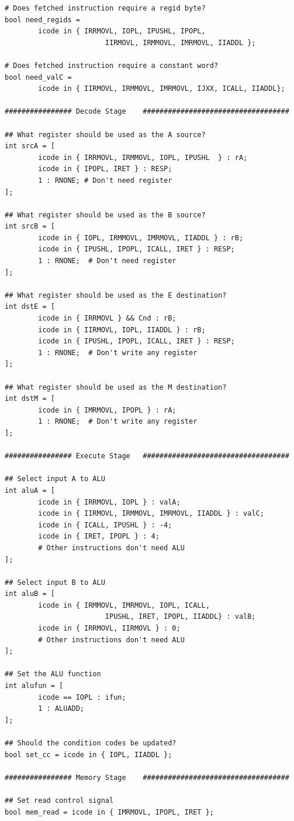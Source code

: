 \documentclass{article}
\begin{document}
\begin{lstlisting}[caption={seq-full.hcl}, label={cd:seq}]
# Does fetched instruction require a regid byte?
bool need_regids =
        icode in { IRRMOVL, IOPL, IPUSHL, IPOPL, 
                        IIRMOVL, IRMMOVL, IMRMOVL, IIADDL };

# Does fetched instruction require a constant word?
bool need_valC =
        icode in { IIRMOVL, IRMMOVL, IMRMOVL, IJXX, ICALL, IIADDL};

################ Decode Stage    ###################################

## What register should be used as the A source?
int srcA = [
        icode in { IRRMOVL, IRMMOVL, IOPL, IPUSHL  } : rA;
        icode in { IPOPL, IRET } : RESP;
        1 : RNONE; # Don't need register
];

## What register should be used as the B source?
int srcB = [
        icode in { IOPL, IRMMOVL, IMRMOVL, IIADDL } : rB;
        icode in { IPUSHL, IPOPL, ICALL, IRET } : RESP;
        1 : RNONE;  # Don't need register
];

## What register should be used as the E destination?
int dstE = [
        icode in { IRRMOVL } && Cnd : rB;
        icode in { IIRMOVL, IOPL, IIADDL } : rB;
        icode in { IPUSHL, IPOPL, ICALL, IRET } : RESP;
        1 : RNONE;  # Don't write any register
];

## What register should be used as the M destination?
int dstM = [
        icode in { IMRMOVL, IPOPL } : rA;
        1 : RNONE;  # Don't write any register
];

################ Execute Stage   ###################################

## Select input A to ALU
int aluA = [
        icode in { IRRMOVL, IOPL } : valA;
        icode in { IIRMOVL, IRMMOVL, IMRMOVL, IIADDL } : valC;
        icode in { ICALL, IPUSHL } : -4;
        icode in { IRET, IPOPL } : 4;
        # Other instructions don't need ALU
];

## Select input B to ALU
int aluB = [
        icode in { IRMMOVL, IMRMOVL, IOPL, ICALL, 
                        IPUSHL, IRET, IPOPL, IIADDL} : valB;
        icode in { IRRMOVL, IIRMOVL } : 0;
        # Other instructions don't need ALU
];

## Set the ALU function
int alufun = [
        icode == IOPL : ifun;
        1 : ALUADD;
];

## Should the condition codes be updated?
bool set_cc = icode in { IOPL, IIADDL };

################ Memory Stage    ###################################

## Set read control signal
bool mem_read = icode in { IMRMOVL, IPOPL, IRET };


\end{lstlisting}
\end{document}
